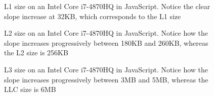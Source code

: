 \documentclass[a4paper,11pt,oneside]{report}
\begin{document}
\begin{figure}
    \centering
    \caption{L1 size on an Intel Core i7-4870HQ in JavaScript. Notice the clear slope increase at 32KB, which corresponds to the L1 size}
    \label{fig:4870_size_l1}
\end{figure}
\begin{figure}
    \centering
    \caption{L2 size on an Intel Core i7-4870HQ in JavaScript. Notice how the slope increases progressively between 180KB and 260KB, whereas the L2 size is 256KB}
    \label{fig:4870_size_l2}
\end{figure}
\begin{figure}
    \centering
    \caption{L3 size on an Intel Core i7-4870HQ in JavaScript. Notice how the slope increases progressively between 3MB and 5MB, whereas the LLC size is 6MB}
    \label{fig:4870_size_l3}
\end{figure}
\end{document}
